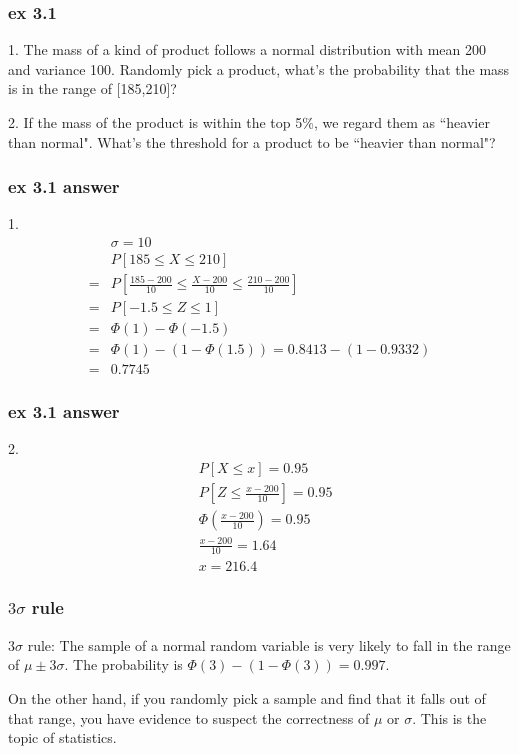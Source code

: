 \documentclass{beamer}
\begin{document}
\begin{frame}
    \frametitle{ex 3.1}
    1. The mass of a kind of product follows a normal distribution with mean 200 and variance 100. Randomly pick a product, what's the probability that the mass is in the range of [185,210]?\par
    \vspace{0.3cm}
    2. If the mass of the product is within the top 5\%, we regard them as ``heavier than normal". What's the threshold for a product to be ``heavier than normal"?
    
\end{frame}

\begin{frame}
    \frametitle{ex 3.1 answer}
    1. 
    \begin{align*}
        & \sigma=10\\
        & P[185\leq X \leq 210]\\
        = & P[\frac{185-200}{10}\leq \frac{X-200}{10}\leq \frac{210-200}{10}]\\
        = & P[-1.5\leq Z \leq 1]\\
        = & \Phi(1)-\Phi(-1.5)\\
        = & \Phi(1)-(1-\Phi(1.5))=0.8413-(1-0.9332)\\
        = & 0.7745
    \end{align*}
    
\end{frame}

\begin{frame}
    \frametitle{ex 3.1 answer}
    2.
    \begin{align*}
        & P[X\leq x]=0.95\\
        & P[Z \leq \frac{x-200}{10}]=0.95\\
        & \Phi(\frac{x-200}{10})=0.95\\
        & \frac{x-200}{10}=1.64\\
        & x=216.4
    \end{align*}
    

\end{frame}

\begin{frame}
    \frametitle{$3 \sigma$ rule}
    $3\sigma$ rule: The sample of a normal random variable is very likely to fall in the range of $\mu\pm 3\sigma$. The probability is $\Phi(3)-(1-\Phi(3))=0.997$.\par
    On the other hand, if you randomly pick a sample and find that it falls out of that range, you have evidence to suspect the correctness of $\mu$ or $\sigma$. This is the topic of statistics.\par


\end{frame}
\end{document}
